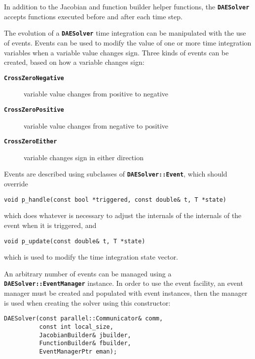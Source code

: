 In addition to the Jacobian and function builder helper functions, the
\texttt{\textbf{DAESolver}} accepts functions executed before and
after each time step.  

The evolution of a \texttt{\textbf{DAESolver}} time integration can be
manipulated with the use of events.  Events can be used to modify the
value of one or more time integration variables when a variable value
changes sign.  Three kinds of events can be created, based on how a
variable changes sign:
\begin{description}
\item[\texttt{\textbf{CrossZeroNegative}}]
  variable value changes from positive to negative
\item[\texttt{\textbf{CrossZeroPositive}}]
  variable value changes from negative to positive
\item[\texttt{\textbf{CrossZeroEither}}]
  variable changes sign in either direction
\end{description}
Events are described using subclasses of
\texttt{\textbf{DAESolver::Event}}, which should override
{ \color{red}
\begin{Verbatim}[fontseries=b]
   void p_handle(const bool *triggered, const double& t, T *state)
\end{Verbatim}
}
which does whatever is necessary to adjust the internals of the
internals of the event when it is triggered, and
{ \color{red}
\begin{Verbatim}[fontseries=b]
   void p_update(const double& t, T *state)
\end{Verbatim}
}
which is used to modify the time integration state vector.

An arbitrary number of events
can be managed using a \texttt{\textbf{DAESolver::EventManager}}
instance.  In order to use the event facility, an event manager must
be created and populated with event instances, then the manager is
used when creating the solver using this constructor:
{ \color{red}
\begin{Verbatim}[fontseries=b]
DAESolver(const parallel::Communicator& comm, 
          const int local_size,
          JacobianBuilder& jbuilder,
          FunctionBuilder& fbuilder,
          EventManagerPtr eman);
\end{Verbatim}
}

